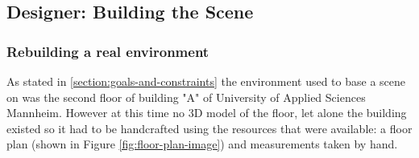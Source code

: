\subsection{Designer: Building the Scene}
\subsubsection{Rebuilding a real environment}
As stated in \ref{section:goals-and-constraints} the environment used to base a scene on was the second floor of building "A" of University of Applied Sciences Mannheim. However at this time no 3D model of the floor, let alone the building existed so it had to be handcrafted using the resources that were available: a floor plan (shown in Figure \ref{fig:floor-plan-image}) and measurements taken by hand.
\newlength{\twosubht}
\newsavebox{\twosubbox}

